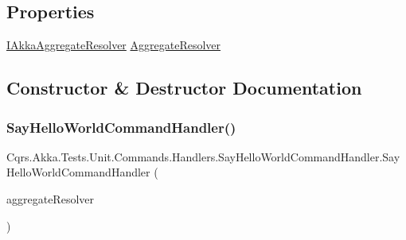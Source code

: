 \subsection*{Properties}
\begin{DoxyCompactItemize}
\item 
\hyperlink{interfaceCqrs_1_1Akka_1_1Domain_1_1IAkkaAggregateResolver}{I\+Akka\+Aggregate\+Resolver} \hyperlink{classCqrs_1_1Akka_1_1Tests_1_1Unit_1_1Commands_1_1Handlers_1_1SayHelloWorldCommandHandler_a4222ccc27f8a550857281bdd97e59b7c}{Aggregate\+Resolver}
\end{DoxyCompactItemize}


\subsection{Constructor \& Destructor Documentation}
\mbox{\label{classCqrs_1_1Akka_1_1Tests_1_1Unit_1_1Commands_1_1Handlers_1_1SayHelloWorldCommandHandler_a421fd9e6d3c9cbb5e93453675af63de0}} 
\subsubsection{\texorpdfstring{Say\+Hello\+World\+Command\+Handler()}{SayHelloWorldCommandHandler()}}
{\footnotesize\ttfamily Cqrs.\+Akka.\+Tests.\+Unit.\+Commands.\+Handlers.\+Say\+Hello\+World\+Command\+Handler.\+Say\+Hello\+World\+Command\+Handler (\begin{DoxyParamCaption}\item[{\hyperlink{interfaceCqrs_1_1Akka_1_1Domain_1_1IAkkaAggregateResolver}{I\+Akka\+Aggregate\+Resolver}}]{aggregate\+Resolver }\end{DoxyParamCaption})}




